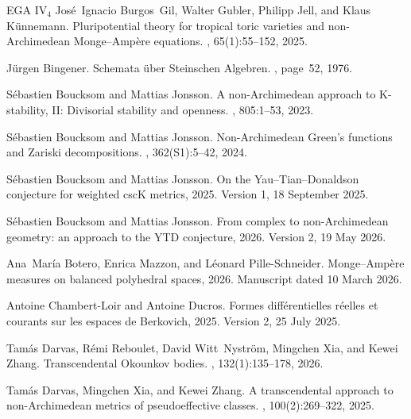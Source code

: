 \documentclass[11pt,a4paper]{article}
\theoremstyle{definition}
\theoremstyle{remark}
\newcommand{\etalchar}[1]{$^{#1}$}
\begin{document}
\clearpage
{}
{}
\begin{thebibliography}{EGA IV$_4$}
Jos{\'e}~Ignacio Burgos~Gil, Walter Gubler, Philipp Jell, and Klaus
  K{\"u}nnemann.
\newblock Pluripotential theory for tropical toric varieties and
  non-{A}rchimedean {M}onge--{A}mp{\`e}re equations.
, 65(1):55--152, 2025.

J\"{u}rgen Bingener.
\newblock Schemata {\"u}ber {S}teinschen {A}lgebren.
, page~52, 1976.

S{\'e}bastien Boucksom and Mattias Jonsson.
\newblock A non-{A}rchimedean approach to {K}-stability, {II}: Divisorial
  stability and openness.
, 805:1--53, 2023.

S{\'e}bastien Boucksom and Mattias Jonsson.
\newblock Non-{A}rchimedean {G}reen's functions and {Z}ariski decompositions.
, 362(S1):5--42, 2024.

S{\'e}bastien Boucksom and Mattias Jonsson.
\newblock On the {Y}au--{T}ian--{D}onaldson conjecture for weighted csc{K}
  metrics, 2025.
\newblock Version 1, 18 September 2025.

S\'{e}bastien Boucksom and Mattias Jonsson.
\newblock From complex to non-{A}rchimedean geometry: an approach to the {YTD}
  conjecture, 2026.
\newblock Version 2, 19 May 2026.

Ana~Mar{\'i}a Botero, Enrica Mazzon, and L{\'e}onard Pille-Schneider.
\newblock Monge--{Amp\`e}re measures on balanced polyhedral spaces, 2026.
\newblock Manuscript dated 10 March 2026.

Antoine Chambert-Loir and Antoine Ducros.
\newblock Formes diff{\'e}rentielles r{\'e}elles et courants sur les espaces de
  {B}erkovich, 2025.
\newblock Version 2, 25 July 2025.

\bibitem[DRWN{\etalchar{+}}26]{DRWNXZ}
Tam\'as Darvas, R\'emi Reboulet, David Witt~Nystr\"om, Mingchen Xia, and Kewei
  Zhang.
\newblock Transcendental {O}kounkov bodies.
, 132(1):135--178, 2026.

Tam\'{a}s Darvas, Mingchen Xia, and Kewei Zhang.
\newblock A transcendental approach to non-{A}rchimedean metrics of
  pseudoeffective classes.
, 100(2):269--322, 2025.


\end{thebibliography}
\end{document}
